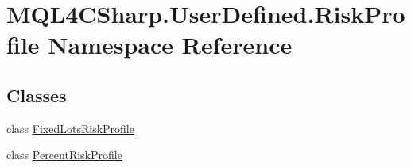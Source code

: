 \hypertarget{namespace_m_q_l4_c_sharp_1_1_user_defined_1_1_risk_profile}{}\section{M\+Q\+L4\+C\+Sharp.\+User\+Defined.\+Risk\+Profile Namespace Reference}
\label{namespace_m_q_l4_c_sharp_1_1_user_defined_1_1_risk_profile}
\subsection*{Classes}
\begin{DoxyCompactItemize}
\item 
class \hyperlink{class_m_q_l4_c_sharp_1_1_user_defined_1_1_risk_profile_1_1_fixed_lots_risk_profile}{Fixed\+Lots\+Risk\+Profile}
\item 
class \hyperlink{class_m_q_l4_c_sharp_1_1_user_defined_1_1_risk_profile_1_1_percent_risk_profile}{Percent\+Risk\+Profile}
\end{DoxyCompactItemize}
